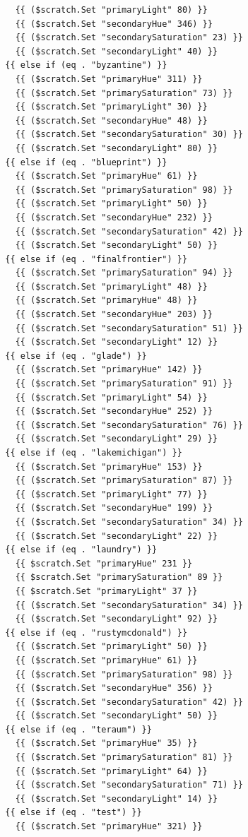 \documentclass[11pt]{article}
\begin{document}
\begin{enumerate}
\begin{verbatim}
    {{ ($scratch.Set "primaryLight" 80) }}
    {{ ($scratch.Set "secondaryHue" 346) }}
    {{ ($scratch.Set "secondarySaturation" 23) }}
    {{ ($scratch.Set "secondaryLight" 40) }}
  {{ else if (eq . "byzantine") }}
    {{ ($scratch.Set "primaryHue" 311) }}
    {{ ($scratch.Set "primarySaturation" 73) }}
    {{ ($scratch.Set "primaryLight" 30) }}
    {{ ($scratch.Set "secondaryHue" 48) }}
    {{ ($scratch.Set "secondarySaturation" 30) }}
    {{ ($scratch.Set "secondaryLight" 80) }}
  {{ else if (eq . "blueprint") }}
    {{ ($scratch.Set "primaryHue" 61) }}
    {{ ($scratch.Set "primarySaturation" 98) }}
    {{ ($scratch.Set "primaryLight" 50) }}
    {{ ($scratch.Set "secondaryHue" 232) }}
    {{ ($scratch.Set "secondarySaturation" 42) }}
    {{ ($scratch.Set "secondaryLight" 50) }}
  {{ else if (eq . "finalfrontier") }}
    {{ ($scratch.Set "primarySaturation" 94) }}
    {{ ($scratch.Set "primaryLight" 48) }}
    {{ ($scratch.Set "primaryHue" 48) }}
    {{ ($scratch.Set "secondaryHue" 203) }}
    {{ ($scratch.Set "secondarySaturation" 51) }}
    {{ ($scratch.Set "secondaryLight" 12) }}
  {{ else if (eq . "glade") }}
    {{ ($scratch.Set "primaryHue" 142) }}
    {{ ($scratch.Set "primarySaturation" 91) }}
    {{ ($scratch.Set "primaryLight" 54) }}
    {{ ($scratch.Set "secondaryHue" 252) }}
    {{ ($scratch.Set "secondarySaturation" 76) }}
    {{ ($scratch.Set "secondaryLight" 29) }}
  {{ else if (eq . "lakemichigan") }}
    {{ ($scratch.Set "primaryHue" 153) }}
    {{ ($scratch.Set "primarySaturation" 87) }}
    {{ ($scratch.Set "primaryLight" 77) }}
    {{ ($scratch.Set "secondaryHue" 199) }}
    {{ ($scratch.Set "secondarySaturation" 34) }}
    {{ ($scratch.Set "secondaryLight" 22) }}
  {{ else if (eq . "laundry") }}
    {{ $scratch.Set "primaryHue" 231 }}
    {{ $scratch.Set "primarySaturation" 89 }}
    {{ $scratch.Set "primaryLight" 37 }}
    {{ ($scratch.Set "secondarySaturation" 34) }}
    {{ ($scratch.Set "secondaryLight" 92) }}
  {{ else if (eq . "rustymcdonald") }}
    {{ ($scratch.Set "primaryLight" 50) }}
    {{ ($scratch.Set "primaryHue" 61) }}
    {{ ($scratch.Set "primarySaturation" 98) }}
    {{ ($scratch.Set "secondaryHue" 356) }}
    {{ ($scratch.Set "secondarySaturation" 42) }}
    {{ ($scratch.Set "secondaryLight" 50) }}
  {{ else if (eq . "teraum") }}
    {{ ($scratch.Set "primaryHue" 35) }}
    {{ ($scratch.Set "primarySaturation" 81) }}
    {{ ($scratch.Set "primaryLight" 64) }}
    {{ ($scratch.Set "secondarySaturation" 71) }}
    {{ ($scratch.Set "secondaryLight" 14) }}
  {{ else if (eq . "test") }}
    {{ ($scratch.Set "primaryHue" 321) }}

\end{verbatim}
\end{enumerate}
\end{document}
